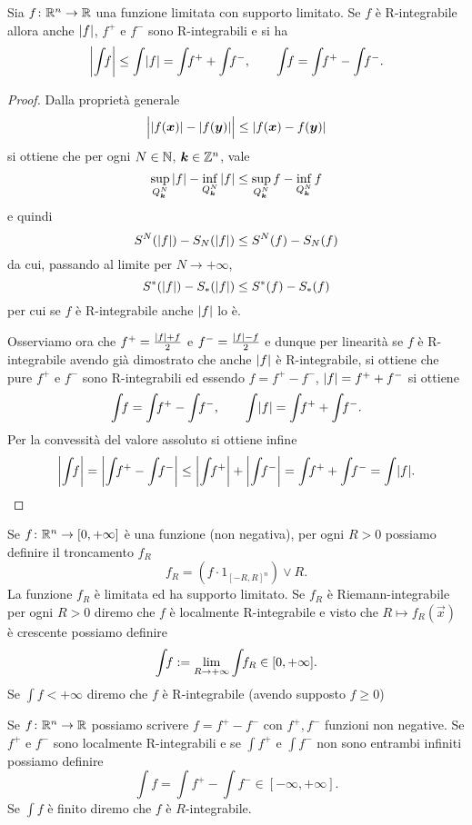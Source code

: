 \begin{theorem}
Sia $f\colon {\mathbb R}^n \to {\mathbb R}$ una funzione limitata con supporto limitato.
Se $f$ è R-integrabile allora anche ${\left|f\right|}$, $f^+$ e $f^-$ sono 
R-integrabili e si ha 
\[
  \abs{\int\!\! f} \le \int\! \abs f = \int\!\! f^+ + \int\!\! f^-, 
  \qquad 
 \int\!\! f = \int\!\! f^+ - \int\!\! f^-.
\]
\end{theorem}
\begin{proof}
Dalla proprietà generale 
\[
  \abs{\rule{0pt}{1.1em}\abs{f(\vec x)} - \abs{f(\vec y)}} \le \abs{f(\vec x) - f(\vec y)}
\]
si ottiene che per ogni $N\in {\mathbb N}$, $\boldsymbol k \in {\mathbb Z}^n$, vale
\[
  \sup_{Q^N_{\boldsymbol k}} {\left|f\right|} - \inf_{Q^N_{\boldsymbol k}} {\left|f\right|}
  \le 
  \sup_{Q^N_{\boldsymbol k}} f - \inf_{Q^N_{\boldsymbol k}} f
\]
e quindi 
\[
   S^N({\left|f\right|}) - S_N({\left|f\right|}) \le S^N(f) - S_N(f)
\] 
da cui, passando al limite per $N\to +\infty$,
\[
  S^*({\left|f\right|}) - S_*({\left|f\right|}) \le S^*(f) - S_*(f)
\]
per cui se $f$ è R-integrabile anche ${\left|f\right|}$ lo è.

Osserviamo ora che $f^+=\frac{{\left|f\right|} + f}{2}$ e $f^-=\frac{{\left|f\right|} - f}{2}$ 
e dunque per linearità se $f$ è R-integrabile avendo già dimostrato 
che anche ${\left|f\right|}$ è R-integrabile, si ottiene che pure $f^+
$ e $f^-$ sono R-integrabili ed essendo $f=f^+-f^-$, ${\left|f\right|} = f^+ + f^-$ si ottiene 
\[
  \int\!\! f = \int\!\! f^+ - \int\!\! f^-, \qquad 
  \int\! \abs f = \int\!\! f^+ + \int\!\! f^-.
\]
Per la convessità del valore assoluto si ottiene infine
\[
 \abs{\int\!\! f} = \abs{\int\!\! f^+ - \int\!\! f^-} 
 \le \abs {\int\!\! f^+} + \abs{\int\!\! f^-}
 = \int\!\! f^+ + \int\!\! f^- = \int\! \abs f.
\]
\end{proof}

\begin{definition}
Se $f\colon {\mathbb R}^n \to [0,+\infty]$ è una funzione (non negativa), per ogni $R>0$ 
possiamo definire il troncamento $f_R$ 
\[
  f_R = (f \cdot 1_{[-R,R]^n}) \vee R.
\]
La funzione $f_R$ è limitata ed ha supporto limitato.
Se $f_R$ è Riemann-integrabile per ogni $R>0$ diremo che $f$ è localmente R-integrabile 
e visto che $R\mapsto f_R(\vec x)$ è crescente possiamo definire
\[
 \int\!\! f := \lim_{R\to+\infty} \int\!\! f_R \in [0,+\infty].
\]
Se $\int\!\! f<+\infty$ diremo che $f$ è R-integrabile (avendo supposto $f\ge 0$)

Se $f\colon {\mathbb R}^n\to {\mathbb R}$ possiamo scrivere $f= f^+-f^-$ con $f^+,f^-$ funzioni non negative.
Se $f^+$ e $f^-$ sono localmente R-integrabili e se 
$\int\!\! f^+$ e $\int\!\! f^-$ non sono entrambi infiniti possiamo definire 
\[
  \int\!\! f = \int\!\! f^+ - \int\!\! f^- \in [-\infty,+\infty].
\]
Se $\int\!\! f$ è finito diremo che $f$ è $R$-integrabile.
\end{definition}


